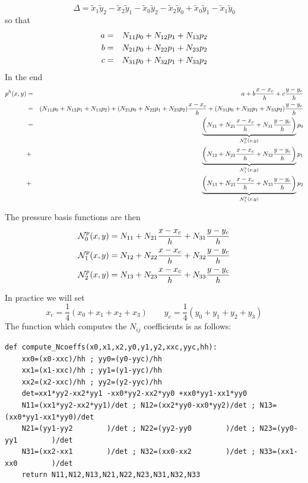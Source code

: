 \[
\Delta 
= \tilde{x}_1\tilde{y}_2-\tilde{x}_2\tilde{y}_1 
- \tilde{x}_0\tilde{y}_2-\tilde{x}_2\tilde{y}_0 
+ \tilde{x}_0\tilde{y}_1-\tilde{x}_1\tilde{y}_0
\]
so that
\begin{eqnarray}
a &=& N_{11}p_0 + N_{12} p_1 + N_{13} p_2 \nonumber\\
b &=& N_{21}p_0 + N_{22} p_1 + N_{23} p_2 \nonumber\\
c &=& N_{31}p_0 + N_{32} p_1 + N_{33} p_2 \nonumber
\end{eqnarray}
In the end
\begin{eqnarray}
p^h(x,y) %
&=& a+b\frac{x-x_c}{h}+c \frac{y-y_c}{h} \nn\\
&=& (N_{11}p_0 + N_{12} p_1 + N_{13} p_2)
+ ( N_{21}p_0 + N_{22} p_1 + N_{23} p_2) \frac{x-x_c}{h}
+ ( N_{31}p_0 + N_{32} p_1 + N_{33} p_2) \frac{y-y_c}{h} \nn\\
&=&\underbrace{\left(N_{11} + N_{21} \frac{x-x_c}{h} + N_{31}\frac{y-y_c}{h}\right)}_{\bN_0^p(x,y)} p_0 \nn\\
&+&  \underbrace{\left(N_{12} + N_{22} \frac{x-x_c}{h} + N_{32}\frac{y-y_c}{h}\right)}_{\bN_1^p(x,y)} p_1 \nn\\
&+&  \underbrace{\left(N_{13} + N_{23} \frac{x-x_c}{h} + N_{33}\frac{y-y_c}{h}\right)}_{\bN_1^p(x,y)} p_2
\label{f76_NNNP}
\end{eqnarray}

The pressure basis functions are then 
\begin{align}
{\mathcal{N}}_0^p(x,y) &= N_{11} + N_{21}\frac{x-x_c}{h}  + N_{31}\frac{y-y_c}{h} \nonumber\\
{\mathcal{N}}_1^p(x,y) &= N_{12} + N_{22}\frac{x-x_c}{h}  + N_{32}\frac{y-y_c}{h} \nonumber\\
{\mathcal{N}}_2^p(x,y) &= N_{13} + N_{23}\frac{x-x_c}{h}  + N_{33}\frac{y-y_c}{h} \nonumber
\end{align}

In practice we will set 
\[
x_c=\frac14(x_0+x_1+x_2+x_3)
\qquad
y_c=\frac14(y_0+y_1+y_2+y_3)
\]
The function which computes the $N_{ij}$ coefficients is as follows:
\begin{lstlisting}
def compute_Ncoeffs(x0,x1,x2,y0,y1,y2,xxc,yyc,hh):
    xx0=(x0-xxc)/hh ; yy0=(y0-yyc)/hh
    xx1=(x1-xxc)/hh ; yy1=(y1-yyc)/hh
    xx2=(x2-xxc)/hh ; yy2=(y2-yyc)/hh
    det=xx1*yy2-xx2*yy1 -xx0*yy2-xx2*yy0 +xx0*yy1-xx1*yy0
    N11=(xx1*yy2-xx2*yy1)/det ; N12=(xx2*yy0-xx0*yy2)/det ; N13=(xx0*yy1-xx1*yy0)/det
    N21=(yy1-yy2        )/det ; N22=(yy2-yy0        )/det ; N23=(yy0-yy1        )/det
    N31=(xx2-xx1        )/det ; N32=(xx0-xx2        )/det ; N33=(xx1-xx0        )/det
    return N11,N12,N13,N21,N22,N23,N31,N32,N33 
\end{lstlisting}



